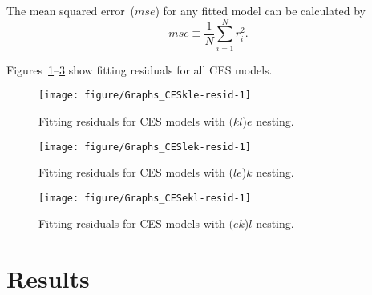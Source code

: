 \documentclass[preprint,authoryear,12pt]{elsarticle}\usepackage[]{graphicx}\usepackage[]{color}
\makeatletter
\def\maxwidth{ %
  \ifdim\Gin@nat@width>\linewidth
    \linewidth
  \else
    \Gin@nat@width
  \fi
}
\newenvironment{knitrout}{}{} %
\makeatother
\begin{document}
The mean squared error~($mse$) for any fitted model can be calculated by
%
\begin{equation} \label{eq:mse}
  mse \equiv \frac{1}{N} \sum_{i=1}^N{r_i^2} .
\end{equation}

Figures~\ref{fig:Graphs CESkle-resid}--\ref{fig:Graphs CESekl-resid}
show fitting residuals for all CES models.
%
\begin{knitrout}
\color{fgcolor}\begin{figure}[H]

{\centering \texttt{[image: figure/Graphs\_CESkle-resid-1]} 

}

\caption[Fitting residuals for CES models with ]{Fitting residuals for CES models with $(kl$)$e$ nesting.}\label{fig:Graphs CESkle-resid}
\end{figure}


\end{knitrout}
%
\begin{knitrout}
\color{fgcolor}\begin{figure}[H]

{\centering \texttt{[image: figure/Graphs\_CESlek-resid-1]} 

}

\caption[Fitting residuals for CES models with (]{Fitting residuals for CES models with ($le$)$k$ nesting.}\label{fig:Graphs CESlek-resid}
\end{figure}


\end{knitrout}
%
\begin{knitrout}
\color{fgcolor}\begin{figure}[H]

{\centering \texttt{[image: figure/Graphs\_CESekl-resid-1]} 

}

\caption[Fitting residuals for CES models with ]{Fitting residuals for CES models with $(ek$)$l$ nesting.}\label{fig:Graphs CESekl-resid}
\end{figure}


\end{knitrout}





\section{Results}
\label{sec:results}
\end{document}
